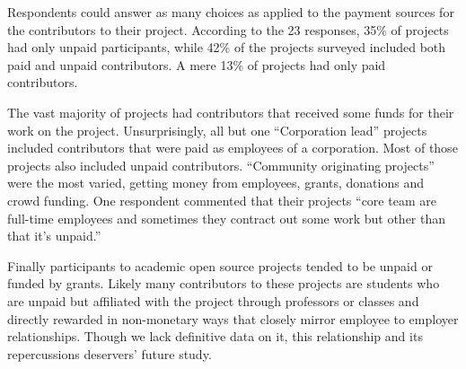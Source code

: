 Respondents could answer as many choices as applied to the payment sources for the contributors to their project. According to the 23 responses, 35\% of projects had only unpaid participants, while 42\% of the projects surveyed included both paid and unpaid contributors. A mere 13\% of projects had only paid contributors.

The vast majority of projects had contributors that received some funds for their work on the project. Unsurprisingly, all but one “Corporation lead” projects included contributors that were paid as employees of a corporation. Most of those projects also included unpaid contributors. “Community  originating projects” were the most varied, getting money from employees, grants, donations and crowd funding. One respondent commented that their projects “core team are full-time employees and sometimes they contract out some work but other than that it's unpaid.”

Finally participants to academic open source projects tended to be unpaid or funded by grants. Likely many contributors to these projects are students who are unpaid but affiliated with the project through professors or classes and directly rewarded in non-monetary ways that closely mirror employee to employer relationships. Though we lack definitive data on it, this relationship and its repercussions deservers’ future study.
